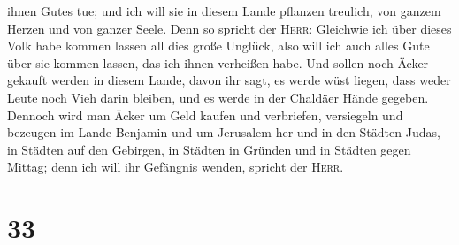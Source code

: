 ihnen Gutes tue; und ich will sie in diesem Lande pflanzen treulich, von
ganzem Herzen und von ganzer Seele.  Denn so spricht der
\textsc{Herr}: Gleichwie ich über dieses Volk habe kommen lassen all
dies große Unglück, also will ich auch alles Gute über sie kommen
lassen, das ich ihnen verheißen habe.  Und sollen noch
Äcker gekauft werden in diesem Lande, davon ihr sagt, es werde wüst
liegen, dass weder Leute noch Vieh darin bleiben, und es werde in der
Chaldäer Hände gegeben.  Dennoch wird man Äcker um Geld
kaufen und verbriefen, versiegeln und bezeugen im Lande Benjamin und um
Jerusalem her und in den Städten Judas, in Städten auf den Gebirgen, in
Städten in Gründen und in Städten gegen Mittag; denn ich will ihr
Gefängnis wenden, spricht der \textsc{Herr}.

\hypertarget{section-32}{%
\section{33}\label{section-32}}

